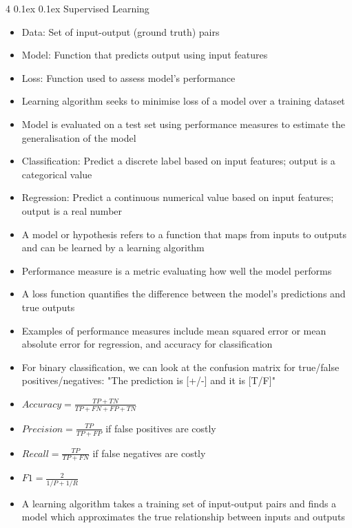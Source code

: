 \documentclass[10pt, landscape]{article}
\makeatletter
\renewcommand{\subsection}{\@startsection{subsection}{2}{0mm}%
  {0.1ex} %
  {0.1ex} %
  {\normalfont\normalsize\bfseries}}
\makeatother
\begin{document}
\begin{multicols*}{4}
\subsection{Supervised Learning}
\begin{itemize}
    \item Data: Set of input-output (ground truth) pairs
    \item Model: Function that predicts output using input features
    \item Loss: Function used to assess model's performance
    \item Learning algorithm seeks to minimise loss of a model over a training dataset
    \item Model is evaluated on a test set using performance measures to estimate the generalisation of the model
    \item Classification: Predict a discrete label based on input features; output is a categorical value
    \item Regression: Predict a continuous numerical value based on input features; output is a real number
    \item A model or hypothesis refers to a function that maps from inputs to outputs and can be learned by a learning algorithm
    \item Performance measure is a metric evaluating how well the model performs
    \item A loss function quantifies the difference between the model's predictions and true outputs
    \item Examples of performance measures include mean squared error or mean absolute error for regression, and accuracy for classification
    \item For binary classification, we can look at the confusion matrix for true/false positives/negatives: "The prediction is [+/-] and it is [T/F]"
    \item $Accuracy=\frac{TP+TN}{TP+FN+FP+TN}$
    \item $Precision=\frac{TP}{TP+FP}$ if false positives are costly
    \item $Recall=\frac{TP}{TP+FN}$ if false negatives are costly
    \item $F1=\frac{2}{1/P+1/R}$
    \item A learning algorithm takes a training set of input-output pairs and finds a model which approximates the true relationship between inputs and outputs
\end{itemize}


\end{multicols*}
\end{document}
